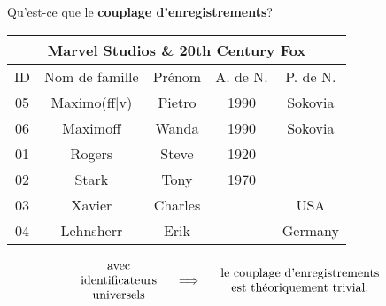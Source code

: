 \begin{frame}{\Large Qu'est-ce que le \textbf{couplage d'enregistrements}?}
\scriptsize
\begin{center}
\vskip -0.1cm
\begin{tabular}{|c|c|c||c|c|}
\hline
	\multicolumn{5}{|c|}{Marvel Studios \;\; \& \;\; 20th Century Fox} \\
\hline
	ID & Nom de famille & Pr\'enom & A. de N. & P. de N. \\
\hline
	\rowcolor{lightGray}
	05 & Maximo{\color{red}(ff|v)} & Pietro & 1990 & Sokovia \\
\hline
	\rowcolor{lightGray}
	06 & Maximo{\color{red}ff} & Wanda & 1990 & Sokovia \\
\hline
	\rowcolor{bgOrange}
	01 & Rogers & Steve & 1920 & \\
\hline
	\rowcolor{bgOrange}
	02 & Stark & Tony & 1970 & \\
\hline
	\rowcolor{lightTurquoise}
	03 & Xavier & Charles & & USA \\
\hline
	\rowcolor{lightTurquoise}
	04 & Lehnsherr & Erik & & Germany \\
\hline
\end{tabular}
\end{center}

\pause

\vskip -0.1cm

\large
\begin{equation*}
\begin{array}{c}
	\textnormal{avec} \\
	\textnormal{identificateurs} \\
	\textnormal{universels}
\end{array}
\quad
\Longrightarrow
\quad
\begin{array}{c}
	\textnormal{le couplage d'enregistrements} \\
	\textnormal{est th\'eoriquement trivial.}
\end{array}
\end{equation*}

\end{frame}
\normalsize

